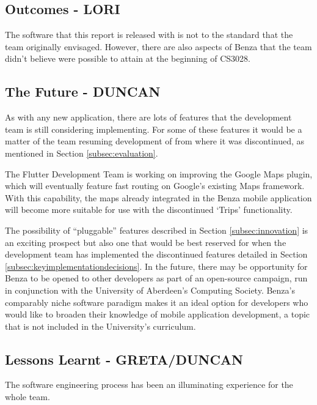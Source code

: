 \documentclass{article}
\begin{document}
    \subsection{Outcomes - LORI}
    The software that this report is released with is not to the standard that the team originally envisaged. However, there are also aspects of Benza that the team  didn't believe were possible to attain at the beginning of CS3028. \par
    
    \subsection{The Future - DUNCAN}
    As with any new application, there are lots of features that the development team is still considering implementing. For some of these features it would be a matter of the team resuming development of from where it was discontinued, as mentioned in Section \ref{subsec:evaluation}. \par
    
    The Flutter Development Team is working on improving the Google Maps plugin, which will eventually feature fast routing on Google's existing Maps framework. With this capability, the maps already integrated in the Benza mobile application will become more suitable  for use with the discontinued `Trips' functionality. \par
    
    The possibility of ``\gls{pluggable}'' features described in Section \ref{subsec:innovation} is an exciting prospect but also one that would be best reserved for when the development team has implemented the discontinued features detailed in Section \ref{subsec:keyimplementationdecisions}. In the future, there may be opportunity for Benza to be opened to other developers as part of an open-source campaign, run in conjunction with the University of Aberdeen's Computing Society. Benza's comparably niche software paradigm makes it an ideal option for developers who would like to broaden their knowledge of mobile application development, a topic that is not included in the University's curriculum. \par
    
    \subsection{Lessons Learnt - GRETA/DUNCAN}
    
    The software engineering process has been an illuminating experience for the whole team. \par 
    
\end{document}
